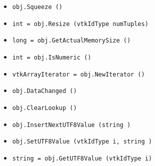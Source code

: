 \begin{itemize}
\item  \verb|obj.Squeeze ()|

\item  \verb|int = obj.Resize (vtkIdType numTuples)|

\item  \verb|long = obj.GetActualMemorySize ()|

\item  \verb|int = obj.IsNumeric ()|

\item  \verb|vtkArrayIterator = obj.NewIterator ()|

\item  \verb|obj.DataChanged ()|

\item  \verb|obj.ClearLookup ()|

\item  \verb|obj.InsertNextUTF8Value (string )|

\item  \verb|obj.SetUTF8Value (vtkIdType i, string )|

\item  \verb|string = obj.GetUTF8Value (vtkIdType i)|

\end{itemize}
